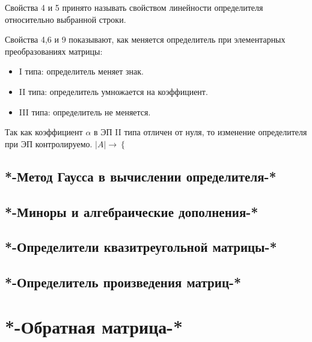 \begin{remark}
Свойства 4 и 5 принято называть свойством линейности определителя относительно выбранной строки.

Свойства 4,6 и 9 показывают, как меняется определитель при элементарных преобразованиях матрицы: \begin{itemize}
\item I типа: определитель меняет знак.
\item II типа: определитель умножается на коэффициент.
\item III типа: определитель не меняется.
\end{itemize}
Так как коэффициент $\alpha$ в ЭП II типа отличен от нуля, то изменение определителя при ЭП контролируемо.
$|A|\rightarrow\left\{\right.$
\end{remark}
\section{*-Метод Гаусса в вычислении определителя-*}
\section{*-Миноры и алгебраические дополнения-*}
\section{*-Определители квазитреугольной матрицы-*}
\section{*-Определитель произведения матриц-*}
\chapter{*-Обратная матрица-*}

